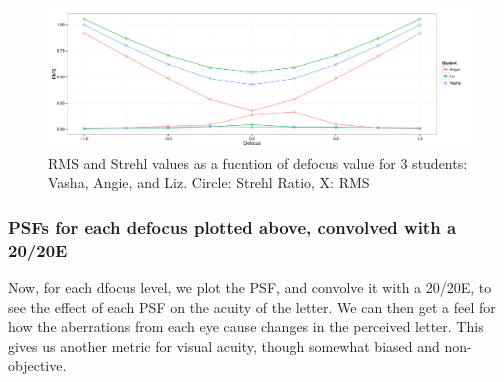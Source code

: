 \documentclass{article}
\begin{document}
\begin{figure}[H]
  \centering
    \includegraphics[width=1\linewidth]{drmsstrehl.pdf}
  \caption{RMS and Strehl values as a fucntion of defocus value for 3 students: Vasha, Angie, and Liz. Circle: Strehl Ratio, X: RMS }
  \label{fig:drmsstrehl}
\end{figure}

\clearpage

\subsubsection{PSFs for each defocus plotted above, convolved with a 20/20E}
Now, for each dfocus level, we plot the PSF, and convolve it with a 20/20E, to see the effect of each PSF on the acuity of the letter. We can then get a feel for how the aberrations from each eye cause changes in the perceived letter. This gives us another metric for visual acuity, though somewhat biased and non-objective.
\end{document}
